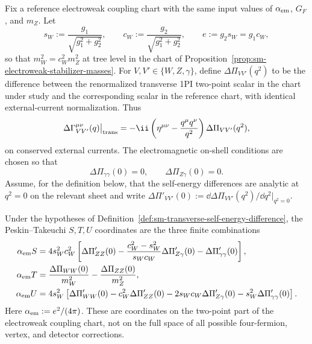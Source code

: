 \begin{definition}
\label{def:sm-transverse-self-energy-difference}
Fix a reference electroweak coupling chart with the same input values of
\(\alpha_{\rm em}\), \(G_F\), and \(m_Z\).  Let
\[
  s_W:=\frac{g_1}{\sqrt{g_1^2+g_2^2}},
  \qquad
  c_W:=\frac{g_2}{\sqrt{g_1^2+g_2^2}},
  \qquad
  e:=g_2s_W=g_1c_W ,
\]
so that \(m_W^2=c_W^2m_Z^2\) at tree level in the chart of
Proposition~\ref{prop:sm-electroweak-stabilizer-masses}.  For
\(V,V'\in\{W,Z,\gamma\}\), define \(\Delta\Pi_{VV'}(q^2)\) to be the
difference between the renormalized transverse 1PI two-point scalar in the
chart under study and the corresponding scalar in the reference chart,
with identical external-current normalization.  Thus
\begin{equation}
  \Delta\Gamma^{\mu\nu}_{VV'}(q)\big|_{\rm trans}
  =
  -\ii
  \left(\eta^{\mu\nu}-\frac{q^\mu q^\nu}{q^2}\right)
  \Delta\Pi_{VV'}(q^2),
  \label{eq:sm-transverse-self-energy-definition}
\end{equation}
on conserved external currents.  The electromagnetic on-shell conditions are
chosen so that
\begin{equation}
  \Delta\Pi_{\gamma\gamma}(0)=0,
  \qquad
  \Delta\Pi_{Z\gamma}(0)=0 .
  \label{eq:sm-oblique-em-onshell}
\end{equation}
Assume, for the definition below, that the self-energy differences are
analytic at \(q^2=0\) on the relevant sheet and write
\(\Delta\Pi'_{VV'}(0):=\dd\Delta\Pi_{VV'}(q^2)/\dd q^2|_{q^2=0}\).
\end{definition}

\begin{definition}
\label{def:sm-stu-coordinates}
Under the hypotheses of
Definition~\ref{def:sm-transverse-self-energy-difference}, the
Peskin--Takeuchi \(S,T,U\) coordinates are the three finite combinations
\begin{equation}
\begin{aligned}
  \alpha_{\rm em} S
  &=
  4s_W^2c_W^2
  \left[
    \Delta\Pi'_{ZZ}(0)
    -\frac{c_W^2-s_W^2}{s_Wc_W}\Delta\Pi'_{Z\gamma}(0)
    -\Delta\Pi'_{\gamma\gamma}(0)
  \right],\\
  \alpha_{\rm em} T
  &=
  \frac{\Delta\Pi_{WW}(0)}{m_W^2}
  -
  \frac{\Delta\Pi_{ZZ}(0)}{m_Z^2},\\
  \alpha_{\rm em} U
  &=
  4s_W^2
  \left[
    \Delta\Pi'_{WW}(0)
    -c_W^2\Delta\Pi'_{ZZ}(0)
    -2s_Wc_W\Delta\Pi'_{Z\gamma}(0)
    -s_W^2\Delta\Pi'_{\gamma\gamma}(0)
  \right].
\end{aligned}
\label{eq:sm-stu-definitions}
\end{equation}
Here
\(\alpha_{\rm em}:=e^2/(4\pi)\).  These are coordinates on the two-point part
of the electroweak coupling chart, not on the full space of all possible
four-fermion, vertex, and detector corrections.
\end{definition}

